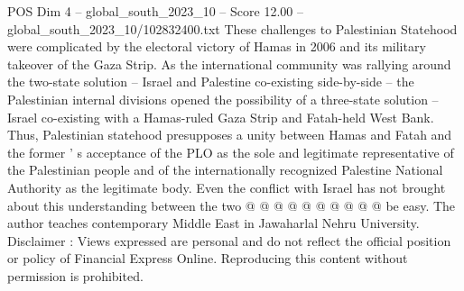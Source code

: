 \begin{textsample}{POS Dim 4 – global\_south\_2023\_10 – Score 12.00 – global\_south\_2023\_10/102832400.txt}
These challenges to Palestinian Statehood were complicated by the electoral victory of Hamas in 2006 and its military takeover of the Gaza Strip.
As the international community was rallying around the two-state solution -- Israel and Palestine co-existing side-by-side -- the Palestinian internal divisions opened the possibility of a three-state solution -- Israel co-existing with a Hamas-ruled Gaza Strip and Fatah-held West Bank.
Thus, Palestinian statehood presupposes a unity between Hamas and Fatah and the former ' s acceptance of the PLO as the sole and legitimate representative of the Palestinian people and of the internationally recognized Palestine National Authority as the legitimate body.
Even the conflict with Israel has not brought about this understanding between the two @ @ @ @ @ @ @ @ @ @ be easy.
The author teaches contemporary Middle East in Jawaharlal Nehru University.
Disclaimer : Views expressed are personal and do not reflect the official position or policy of Financial Express Online.
Reproducing this content without permission is prohibited.

\end{textsample}
